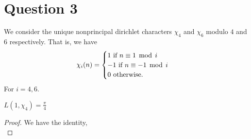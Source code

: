 \documentclass{unswmaths}
\begin{document}
    \section*{Question 3}
    We consider the unique nonprincipal  dirichlet characters $\chi_4$ and $\chi_6$ modulo $4$ and $6$ respectively. That is, we have
    \begin{equation*}
        \chi_i(n) = \begin{cases}
            1\text{ if }n \equiv 1 \;\operatorname{mod}\;i\\
            -1\text{ if }n \equiv -1 \;\operatorname{mod}\;i\\
            0\text{ otherwise.}
        \end{cases}
    \end{equation*}
    For $i = 4,6$.
    \begin{theorem}
        $L(1,\chi_4) = \frac{\pi}{4}$
    \end{theorem}
    \begin{proof}
        We have the identity,
        \begin{equation*}
            
        \end{equation*}
    \end{proof}
\end{document}
